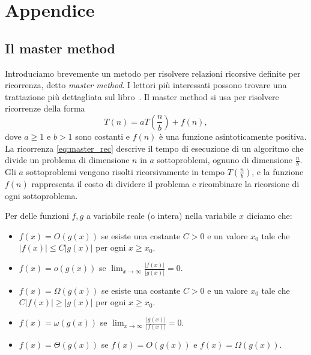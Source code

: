 \chapter{Appendice}

\section{Il master method}

Introduciamo brevemente un metodo per risolvere relazioni ricorsive definite per ricorrenza, detto
\emph{master method}. I lettori più interessati possono trovare una trattazione più dettagliata sul
libro~\cite{cormen2022introduction}. Il master method si usa per risolvere ricorrenze della forma
\begin{equation}
  \label{eq:master_rec}
  T(n) = aT(\frac{n}{b}) + f(n),
\end{equation}
dove $ a \ge 1 $ e $ b>1 $ sono costanti e $ f(n) $ è una funzione asintoticamente positiva. La
ricorrenza \ref{eq:master_rec} descrive il tempo di esecuzione di un algoritmo che divide un
problema di dimensione $ n $ in $ a $ sottoproblemi, ognuno di dimensione $ \frac{n}{b} $. Gli $ a $
sottoproblemi vengono risolti ricorsivamente in tempo $ T(\frac{n}{b}) $, e la funzione $ f(n) $
rappresenta il costo di dividere il problema e ricombinare la ricorsione di ogni sottoproblema.

\begin{definition}
  Per delle funzioni $ f,g $ a variabile reale (o intera) nella variabile $ x $ diciamo che:
  \begin{itemize}
    \item $ f(x) = O(g(x)) $ se esiste una costante $ C > 0 $ e un valore $ x_0 $ tale che $ |f(x)|
    \le C|g(x)| $ per ogni $ x\ge x_0 $.
  \item $ f(x) = o(g(x)) $ se $ \lim_{x \to \infty } \frac{|f(x)|}{|g(x)|} = 0 $.
  \item $ f(x) = \Omega(g(x))$ se esiste una costante $ C>0 $ e un valore $ x_0  $ tale che $
    C|f(x)| \ge |g(x)| $ per ogni $ x\ge x_0 $.
  \item $ f(x) = \omega(g(x)) $ se $ \lim_{x \to \infty } \frac{|g(x)|}{|f(x)|} = 0 $.
  \item $ f(x) = \Theta(g(x)) $ se $ f(x) = O(g(x)) $ e $ f(x) = \Omega(g(x)) $.
  \end{itemize}
  
\end{definition}

